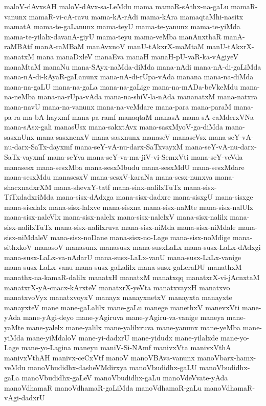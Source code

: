{maloV-dAvxsAH
maloV-dAvx-sa-LeMdu
mama
mamaR-sAthx-na-gaLu
mamaR-vanunx
mamaR-vi-cA-ravu
mama-kA-rAdi
mama-kAra
mamaqtaMhi-nasitx
mamatA
mama-te-gaLanunx
mama-teyU
mama-te-yanunx
mama-te-yiMda
mama-te-yilalx-davanA-giyU
mama-teyu
mama-veMba
manAnxthaR
manA-raMBAtf
manA-raMBaM
manAvxnoV
manU-tAkxrX-maMtaM
manU-tAkxrX-manatxM
mana
manaDxleV
manaEva
manaH
manaH-pU-vaR-ka-vAgiyeV
manaMtaM
manaNu
mana-SAyx-naMda-diMda
mana-nAdi
mana-nA-di-gaLiMda
mana-nA-di-kAyaR-gaLanunx
mana-nA-di-rUpa-vAda
manana
mana-na-diMda
mana-na-gaLU
mana-na-gaLa
mana-na-gaLige
mana-na-mADa-beVkeMdu
mana-na-neMba
mana-na-rUpa-vAda
mana-na-shiV-la-nAda
mananatxM
mana-natxra
mana-navU
mana-na-vanunx
mana-na-veMdare
mana-para
mana-paraM
mana-pa-ra-ma-bA-hayxmf
mana-pa-ramf
manaqtaM
manasA
mana-sA-caMderxVNa
mana-sAsx-gali
manasUsx
mana-sakxtAvx
mana-sasxMyoV-ga-diMda
mana-sasxnUnx
mana-sasxnenxV
mana-sasxnunx
manaseV
manaseVsx
mana-seY-vA-nu-darx-SaTx-dayxmf
mana-seY-vA-nu-darx-SaTxvayxM
mana-seY-vA-nu-darx-SaTx-vayxmf
mana-seYva
mana-seY-va-ma-jiV-vi-SemxVti
mana-seY-veVda
manasesx
mana-sesxMba
mana-sesxMbudu
mana-sesxMdU
mana-sesxMdare
mana-sesxMdu
manasesxV
mana-sesxV-karaNa
mana-sesx-nunxva
mana-shacxnadxrXM
mana-shevxY-tatf
mana-sinx-nalilxTuTx
mana-sisx-TiTxdadxriMda
mana-sisx-dAdxga
mana-sisx-dadxre
mana-sisxgU
mana-sisxge
mana-sisxlalx
mana-sisx-lalxve
mana-sisxna
mana-sisx-naMte
mana-sisx-nalUlx
mana-sisx-naleVlx
mana-sisx-nalelx
mana-sisx-nalelxV
mana-sisx-nalilx
mana-sisx-nalilxTuTx
mana-sisx-nalilxruva
mana-sisx-niMda
mana-sisx-niMdale
mana-sisx-niMdaleV
mana-sisx-noDane
mana-sisx-no-Lage
mana-sisx-noMdige
mana-sithxkoV
manasoV
manasunx
manasusx
mana-susxLaLx
mana-susx-LaLx-dAdxgi
mana-susx-LaLx-va-nAdarU
mana-susx-LaLx-vanU
mana-susx-LaLx-vanige
mana-susx-LaLx-vanu
mana-susx-gaLalilx
mana-susx-gaLeraDU
manathxM
manathx-na-kamaR-dalilx
manatxH
manatxM
manatxqq
manatxrX-vi-jAcnxtaM
manatxrX-yA-cnacx-kArxteV
manatxrX-yeVta
manatxvayxH
manatxvo
manatxvoVyx
manatxvoyxV
manayx
manayxnetxV
manayxta
manayxte
manayxteV
mane
mane-gaLalilx
mane-gaLu
manege
manethxV
manevxVti
mane-yAda
mane-yAgi-deyo
mane-yAgiruva
mane-yAgiru-va-vanige
maneya
mane-yaMte
mane-yalelx
mane-yalilx
mane-yalilxruva
mane-yanunx
mane-yeMba
mane-yiMda
mane-yiMdaloV
mane-yi-dadxrU
mane-yidudx
mane-yilalxde
mane-yo-Lage
mane-yo-Lagina
maneyu
maniV-Si-NAmf
manivxVta
manivxVthA
manivxVthAH
manivx-ceCxVtf
manoV
manoVBAva-vanunx
manoVbarx-hamx-veMdu
manoVbudidhx-dasheVMdirxya
manoVbudidhx-gaLU
manoVbudidhx-gaLa
manoVbudidhx-gaLeV
manoVbudidhx-gaLu
manoVdeVvate-yAda
manoVdhamaR
manoVdhamaR-gaLiMda
manoVdhamaR-gaLu
manoVdhamaR-vAgi-dadxrU
}
